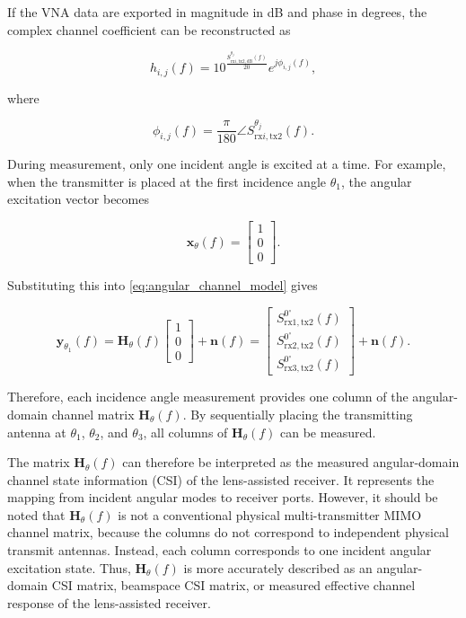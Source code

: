 \documentclass[10pt]{article}
\begin{document}
If the VNA data are exported in magnitude in dB and phase in degrees, the complex channel coefficient can be reconstructed as

\begin{equation}
h_{i,j}(f)
=
10^{\frac{S_{\mathrm{rx}i,\mathrm{tx2},\mathrm{dB}}^{\theta_j}(f)}{20}}
e^{j\phi_{i,j}(f)},
\label{eq:s21_db_to_complex}
\end{equation}

where

\begin{equation}
\phi_{i,j}(f)=\frac{\pi}{180}\angle S_{\mathrm{rx}i,\mathrm{tx2}}^{\theta_j}(f).
\end{equation}

During measurement, only one incident angle is excited at a time. 
For example, when the transmitter is placed at the first incidence angle \(\theta_1\), the angular excitation vector becomes

\begin{equation}
\mathbf{x}_{\theta}(f)=
\begin{bmatrix}
1\\
0\\
0
\end{bmatrix}.
\end{equation}

Substituting this into \eqref{eq:angular_channel_model} gives

\begin{equation}
\mathbf{y}_{\theta_1}(f)
=
\mathbf{H}_{\theta}(f)
\begin{bmatrix}
1\\
0\\
0
\end{bmatrix}
+
\mathbf{n}(f)
=
\begin{bmatrix}
S_{\mathrm{rx1},\mathrm{tx2}}^{0^\circ}(f)\\
S_{\mathrm{rx2},\mathrm{tx2}}^{0^\circ}(f)\\
S_{\mathrm{rx3},\mathrm{tx2}}^{0^\circ}(f)
\end{bmatrix}
+
\mathbf{n}(f).
\label{eq:first_column_measurement}
\end{equation}

Therefore, each incidence angle measurement provides one column of the angular-domain channel matrix \(\mathbf{H}_{\theta}(f)\). 
By sequentially placing the transmitting antenna at \(\theta_1\), \(\theta_2\), and \(\theta_3\), all columns of \(\mathbf{H}_{\theta}(f)\) can be measured.

The matrix \(\mathbf{H}_{\theta}(f)\) can therefore be interpreted as the measured angular-domain channel state information (CSI) of the lens-assisted receiver. 
It represents the mapping from incident angular modes to receiver ports. 
However, it should be noted that \(\mathbf{H}_{\theta}(f)\) is not a conventional physical multi-transmitter MIMO channel matrix, because the columns do not correspond to independent physical transmit antennas. 
Instead, each column corresponds to one incident angular excitation state. 
Thus, \(\mathbf{H}_{\theta}(f)\) is more accurately described as an angular-domain CSI matrix, beamspace CSI matrix, or measured effective channel response of the lens-assisted receiver.
\end{document}
